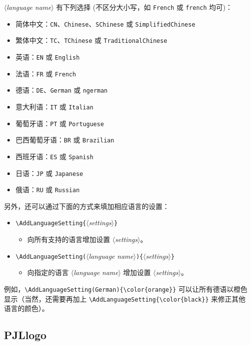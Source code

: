 \documentclass[Chinese,English,French,allowbf,puretext]{lebhart}
\providecommand{\meta}[1]{$\langle${\normalfont\itshape#1}$\rangle$}
\begin{document}
\medskip
\meta{language name} 有下列选择 (不区分大小写，如 \texttt{French} 或 \texttt{french} 均可)：
\begin{itemize}
    \item 简体中文：\texttt{CN}、\texttt{Chinese}、\texttt{SChinese} 或 \texttt{SimplifiedChinese}
    \item 繁体中文：\texttt{TC}、\texttt{TChinese} 或 \texttt{TraditionalChinese}
    \item 英语：\texttt{EN} 或 \texttt{English}
    \item 法语：\texttt{FR} 或 \texttt{French}
    \item 德语：\texttt{DE}、\texttt{German} 或 \texttt{ngerman}
    \item 意大利语：\texttt{IT} 或 \texttt{Italian}
    \item 葡萄牙语：\texttt{PT} 或 \texttt{Portuguese}
    \item 巴西葡萄牙语：\texttt{BR} 或 \texttt{Brazilian}
    \item 西班牙语：\texttt{ES} 或 \texttt{Spanish}
    \item 日语：\texttt{JP} 或 \texttt{Japanese}
    \item 俄语：\texttt{RU} 或 \texttt{Russian}
\end{itemize}

\medskip
另外，还可以通过下面的方式来填加相应语言的设置：
\begin{itemize}
    \item \lstinline|\AddLanguageSetting{|\meta{settings}\lstinline|}|
    \begin{itemize}
        \item 向所有支持的语言增加设置 \meta{settings}。
    \end{itemize}
    \item \lstinline|\AddLanguageSetting(|\meta{language name}\lstinline|){|\meta{settings}\lstinline|}|
    \begin{itemize}
        \item 向指定的语言 \meta{language name} 增加设置 \meta{settings}。
    \end{itemize}
\end{itemize}
例如，\lstinline|\AddLanguageSetting(German){\color{orange}}| 可以让所有德语以橙色显示（当然，还需要再加上 \lstinline|\AddLanguageSetting{\color{black}}| 来修正其他语言的颜色）。

\clearpage
\subsection{PJLlogo}
\end{document}
